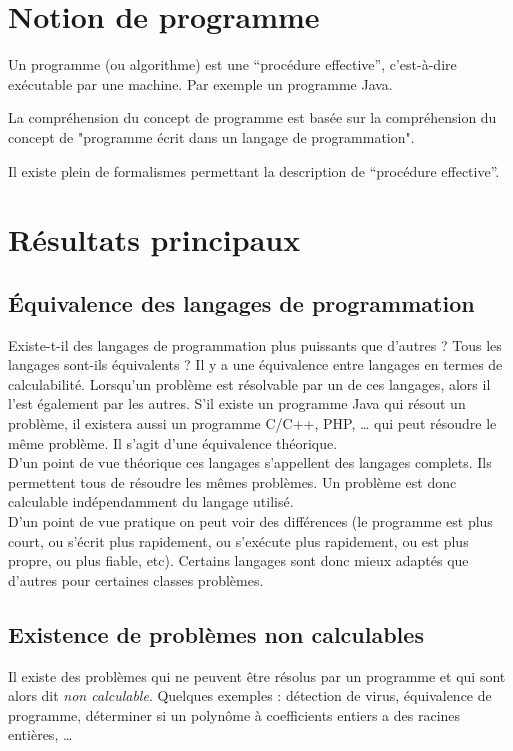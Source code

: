 \section{Notion de programme}
\label{sec:notion_de_programme}

Un programme (ou algorithme) est une ``procédure effective'', c'est-à-dire exécutable par une machine. Par exemple un programme Java.

La compréhension du concept de programme est basée sur la compréhension du concept de "programme écrit dans un langage de programmation".

Il existe plein de formalismes permettant la description de ``procédure effective''.

\section{Résultats principaux}
\label{sec:r_sultat_principaux}

\subsection{ Équivalence des langages de programmation}
\label{subsec:equivalence_des_langages_de_programmation}

Existe-t-il des langages de programmation plus puissants que d'autres ? Tous les langages sont-ils équivalents ?
\newline
Il y a une équivalence entre langages en termes de calculabilité.  Lorsqu'un problème est résolvable par un de ces langages, alors il l'est également par les autres.
S'il existe un programme Java qui résout un problème, il existera aussi un programme C/C++, PHP, … qui peut résoudre le même problème. Il s'agit d'une équivalence théorique.\\
D'un point de vue théorique ces langages s'appellent des langages complets. Ils permettent tous de résoudre les mêmes problèmes.  Un problème est donc calculable indépendamment du langage utilisé. \\
D'un point de vue pratique on peut voir des différences (le programme est plus court, ou s'écrit plus rapidement, ou s'exécute plus rapidement, ou est plus propre, ou plus fiable, etc).  Certains langages sont donc mieux adaptés que d'autres pour certaines classes problèmes.


\subsection{Existence de problèmes non calculables}
\label{subsec:existence_de_problemes_non_calculables}
	Il existe des problèmes qui ne peuvent être résolus par un programme et qui sont alors dit \emph{non calculable}.
	Quelques exemples :
		détection de virus,
        équivalence de programme,
        déterminer si un polynôme à coefficients entiers a des racines entières, \ldots

